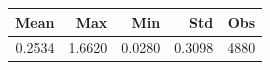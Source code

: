 \begin{tabular}{rrrrr}
\toprule
Mean & Max & Min & Std & Obs \\
\midrule
0.2534 & 1.6620 & 0.0280 & 0.3098 & 4880 \\
\bottomrule
\end{tabular}
